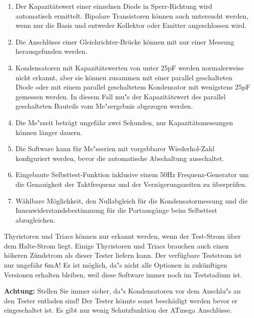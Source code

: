 \begin{enumerate}
\item Der Kapazit\"atswert einer einzelnen Diode in Sperr-Richtung wird automatisch ermittelt.
Bipolare Transistoren k\"onnen auch untersucht werden, wenn nur die Basis und entweder Kollektor oder Emitter angeschlossen wird.
\item Die Anschl\"usse einer Gleichrichter-Br\"ucke k\"onnen mit nur einer Messung herausgefunden werden.
\item Kondensatoren mit Kapazit\"atswerten von unter 25pF werden normalerweise nicht erkannt, 
aber sie k\"onnen zusammen mit einer parallel geschalteten Diode oder mit einem parallel geschaltetem Kondensator mit
wenigstens 25pF gemessen werden.
In diesem Fall mu"s der Kapazit\"atswert des parallel geschalteten Bauteils vom Me"sergebnis abgezogen werden.
\item Die Me"szeit betr\"agt ungef\"ahr zwei Sekunden, nur Kapazit\"atsmessungen k\"onnen l\"anger dauern.
\item Die Software kann f\"ur Me"sserien mit vorgebbarer Wiederhol-Zahl konfiguriert werden, bevor die automatische Abschaltung ausschaltet.
\item Eingebaute Selbsttest-Funktion inklusive einem 50Hz Frequenz-Generator um die Genauigkeit der Taktfrequenz und der Verz\"ogerungszeiten zu \"uberpr\"ufen.
\item W\"ahlbare M\"oglichkeit, den Nullabgleich f\"ur die Kondensatormessung und die Innenwiderstandsbestimmung f\"ur die
Portausg\"ange beim Selbsttest abzugleichen.
\end{enumerate}

Thyristoren und Triacs k\"onnen nur erkannt werden, wenn der Test-Strom \"uber dem Halte-Strom liegt.
Einige Thyristoren und Triacs brauchen auch einen h\"oheren Z\"undstrom als dieser Tester liefern kann.
Der verf\"ugbare Teststrom ist nur ungef\"ahr 6mA!
Es ist m\"oglich, da"s nicht alle Optionen in zuk\"unftigen Versionen erhalten bleiben, weil diese Software
immer noch im Teststadium ist.

\vspace{1cm}
\textbf{{\Large Achtung:}} Stellen Sie immer sicher, da"s Kondensatoren vor dem Anschlu"s an den Tester entladen sind!
Der Tester k\"onnte sonst besch\"adigt werden bevor er eingeschaltet ist.
Es gibt nur wenig Schutzfunktion der ATmega Anschl\"usse.


